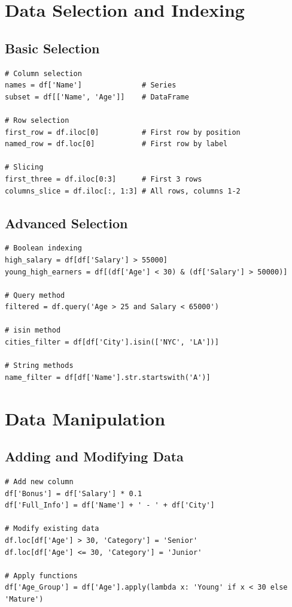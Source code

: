 \documentclass[12pt,a4paper]{article}
\begin{document}
\section{Data Selection and Indexing}

\subsection{Basic Selection}

\begin{lstlisting}
# Column selection
names = df['Name']              # Series
subset = df[['Name', 'Age']]    # DataFrame

# Row selection
first_row = df.iloc[0]          # First row by position
named_row = df.loc[0]           # First row by label

# Slicing
first_three = df.iloc[0:3]      # First 3 rows
columns_slice = df.iloc[:, 1:3] # All rows, columns 1-2
\end{lstlisting}

\subsection{Advanced Selection}

\begin{lstlisting}
# Boolean indexing
high_salary = df[df['Salary'] > 55000]
young_high_earners = df[(df['Age'] < 30) & (df['Salary'] > 50000)]

# Query method
filtered = df.query('Age > 25 and Salary < 65000')

# isin method
cities_filter = df[df['City'].isin(['NYC', 'LA'])]

# String methods
name_filter = df[df['Name'].str.startswith('A')]
\end{lstlisting}

\section{Data Manipulation}

\subsection{Adding and Modifying Data}

\begin{lstlisting}
# Add new column
df['Bonus'] = df['Salary'] * 0.1
df['Full_Info'] = df['Name'] + ' - ' + df['City']

# Modify existing data
df.loc[df['Age'] > 30, 'Category'] = 'Senior'
df.loc[df['Age'] <= 30, 'Category'] = 'Junior'

# Apply functions
df['Age_Group'] = df['Age'].apply(lambda x: 'Young' if x < 30 else 'Mature')
\end{lstlisting}
\end{document}

